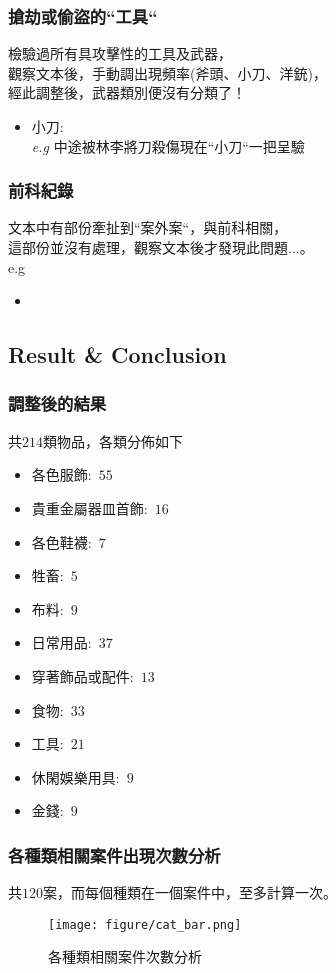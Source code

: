 \documentclass{beamer}
\begin{document}
\begin{frame}
\frametitle{搶劫或偷盜的``工具``}
檢驗過所有具攻擊性的工具及武器，\\
觀察文本後，手動調出現頻率(斧頭、小刀、洋銃)，\\
經此調整後，武器類別便沒有分類了！
\begin{itemize}
    \item 小刀:\\
    \textit{e.g} 中途被林李將刀殺傷現在``小刀``一把呈驗
\end{itemize}
\end{frame}
\begin{frame}
    \frametitle{前科紀錄}
    文本中有部份牽扯到``案外案``，與前科相關，\\
    這部份並沒有處理，觀察文本後才發現此問題...。\\
    e.g\\
    \begin{itemize}
        \item 
    \end{itemize}
\end{frame}
\subsection{Result \& Conclusion}
\begin{frame}
    \frametitle{調整後的結果}
    共\textbf{$214$}類物品，各類分佈如下
        \begin{itemize}
        \item 各色服飾:~$55$
        \item 貴重金屬器皿首飾:~$16$
        \item 各色鞋襪:~$7$
        \item 牲畜:~$5$
        \item 布料:~$9$
        \item 日常用品:~$37$
        \item 穿著飾品或配件:~$13$
        \item 食物:~$33$
        \item 工具:~$21$
        \item 休閑娛樂用具:~$9$
        \item 金錢:~$9$
        \end{itemize}
\end{frame}

\begin{frame}
\frametitle{各種類相關案件出現次數分析}
共$120$案，而每個種類在一個案件中，至多計算一次。
\begin{figure}[H]
    	\begin{center}
        	\texttt{[image: figure/cat\_bar.png]}
			\caption{各種類相關案件次數分析}
    	\end{center}
	\end{figure}
\end{frame}
\end{document}
